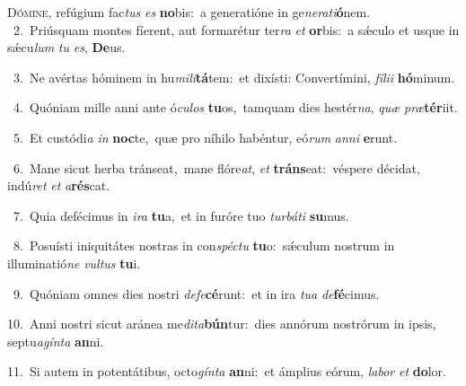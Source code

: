 \lettrine{\initial\textcolor{\initialcolor}{D}}{ómine,} refúgium fac\textit{tus} \textit{es} \textbf{no}\-bis:~\star a generatióne in ge\-\textit{ne}\-\textit{ra}\textit{ti}\textbf{ó}nem.\\
{\numbfont\textcolor{\numbcolor}{~2.}}~Priúsquam montes fíerent, aut formarétur ter\textit{ra} \textit{et} \textbf{or}\-bis:~\star a sǽculo et usque in sǽcu\textit{lum} \textit{tu} \textit{es}\-, \textbf{De}\-us.\par
{\numbfont\textcolor{\numbcolor}{~3.}}~Ne avértas hóminem in hu\-\textit{mi}\-\textit{li}\textbf{tá}tem:~\star et dixísti: Convertímini, \textit{fí}\-\textit{li}\textit{i} \textbf{hó}\-minum.\par
{\numbfont\textcolor{\numbcolor}{~4.}}~Quóniam mille anni ante ó\-\textit{cu}\-\textit{los} \textbf{tu}\-os,~\star tamquam dies hestér\-\textit{na}\-, \textit{quæ} \textit{præ}\-\textbf{tér}iit.\par
{\numbfont\textcolor{\numbcolor}{~5.}}~Et custódi\textit{a} \textit{in} \textbf{noc}\-te,~\star quæ pro níhilo habéntur, eó\textit{rum} \textit{an}\-\textit{ni} \textbf{e}\-runt.\par
{\numbfont\textcolor{\numbcolor}{~6.}}~Mane sicut herba tránseat,~\dagger mane flóre\-\textit{at}\-, \textit{et} \textbf{tráns}\-eat:~\star véspere décidat, indú\textit{ret} \textit{et} \textit{a}\-\textbf{rés}cat.\par
{\numbfont\textcolor{\numbcolor}{~7.}}~Quia defécimus in \textit{i}\-\textit{ra} \textbf{tu}\-a,~\star et in furóre tuo \textit{tur}\-\textit{bá}\textit{ti} \textbf{su}\-mus.\par
{\numbfont\textcolor{\numbcolor}{~8.}}~Posuísti iniquitátes nostras in con\-\textit{spéc}\-\textit{tu} \textbf{tu}\-o:~\star sǽculum nostrum in illuminatió\textit{ne} \textit{vul}\-\textit{tus} \textbf{tu}\-i.\par
{\numbfont\textcolor{\numbcolor}{~9.}}~Quóniam omnes dies nostri \textit{de}\-\textit{fe}\textbf{cé}runt:~\star et in ira \textit{tu}\-\textit{a} \textit{de}\-\textbf{fé}cimus.\par
{\numbfont\textcolor{\numbcolor}{10.}}~Anni nostri sicut aránea me\-\textit{di}\-\textit{ta}\textbf{bún}tur:~\star dies annórum nostrórum in ipsis, septu\-\textit{a}\-\textit{gín}\textit{ta} \textbf{an}\-ni.\par
{\numbfont\textcolor{\numbcolor}{11.}}~Si autem in potentátibus, octo\-\textit{gín}\-\textit{ta} \textbf{an}\-ni:~\star et ámplius eórum, \textit{la}\-\textit{bor} \textit{et} \textbf{do}\-lor.\par
